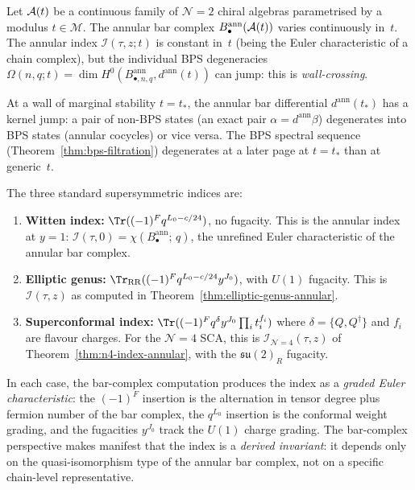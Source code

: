 \begin{conjecture}%
\label{conj:wall-crossing-bar}%
%
%
Let $\mathcal{A}(t)$ be a continuous family of $\mathcal N=2$
chiral algebras parametrised by a modulus
$t\in\mathcal{M}$. The annular bar complex
$B^{\mathrm{ann}}_\bullet(\mathcal{A}(t))$ varies continuously
in~$t$. The annular index
$\mathcal{I}(\tau,z;t)$ is constant in~$t$
(being the Euler characteristic of a chain complex),
but the individual BPS degeneracies
$\Omega(n,q;t) = \dim H^0(B^{\mathrm{ann}}_{\bullet,n,q},
d^{\mathrm{ann}}(t))$
can jump: this is \emph{wall-crossing}.

At a wall of marginal stability $t = t_*$, the annular
bar differential $d^{\mathrm{ann}}(t_*)$ has a kernel
jump: a pair of non-BPS states (an exact pair
$\alpha = d^{\mathrm{ann}}\beta$) degenerates into BPS
states (annular cocycles) or vice versa. The
BPS spectral sequence
(Theorem~\ref{thm:bps-filtration})
degenerates at a later page at $t = t_*$ than at
generic~$t$.
\end{conjecture}

\begin{remark}%
\label{rem:physical-comparison}%
%
%
The three standard supersymmetric indices are:
\begin{enumerate}[label=(\roman*)]
\item \textbf{Witten index:}
 $\Tr((-1)^F q^{L_0-c/24})$, no fugacity. This is
 the annular index at $y=1$:
 $\mathcal{I}(\tau,0) = \chi(B^{\mathrm{ann}}_\bullet;\,q)$,
 the unrefined Euler characteristic of the annular bar
 complex.
\item \textbf{Elliptic genus:}
 $\Tr_{\mathrm{RR}}((-1)^F q^{L_0-c/24} y^{J_0})$,
 with $U(1)$ fugacity. This is
 $\mathcal{I}(\tau,z)$ as computed in
 Theorem~\ref{thm:elliptic-genus-annular}.
\item \textbf{Superconformal index:}
 $\Tr((-1)^F q^{\delta} y^{J_0} \prod_i t_i^{f_i})$
 where $\delta = \{Q,Q^\dagger\}$ and $f_i$ are
 flavour charges. For the $\mathcal N=4$ SCA, this
 is $\mathcal{I}_{\mathcal{N}=4}(\tau,z)$ of
 Theorem~\ref{thm:n4-index-annular}, with the
 $\mathfrak{su}(2)_R$ fugacity.
\end{enumerate}
In each case, the bar-complex computation produces the
index as a \emph{graded Euler characteristic}: the
$(-1)^F$ insertion is the alternation in tensor degree
plus fermion number of the bar complex, the $q^{L_0}$
insertion is the conformal weight grading, and the
fugacities $y^{J_0}$ track the $U(1)$ charge grading.
The bar-complex perspective makes manifest that the
index is a \emph{derived invariant}: it depends only
on the quasi-isomorphism type of the annular bar complex,
not on a specific chain-level representative.
\end{remark}

